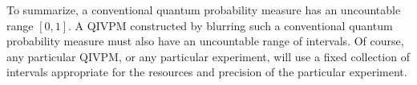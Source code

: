 \documentclass[english,reprint, aps, prl,superscriptaddress, showpacs,
showkeys, longbibliography, amsmath, amssymb, floatfix]{revtex4-1}
\theoremstyle{plain}
\theoremstyle{definition}
\newcommand{\imposs}{{\text{\wesa{impossible}}}}
\newcommand{\necess}{{\text{\wesa{certain}}}}
\newcommand{\proj}[1]{\op{#1}{#1}}
\newcommand{\ultramodular}{\mathcal{M}}
\newcommand{\muB}{\ensuremath{\mu^{B}}}
\newcommand{\gerardo}[1]{\fbox{\begin{minipage}{0.9\linewidth}\color{OliveGreen}{Gerardo says: #1}\end{minipage}}}
\begin{document}
To summarize, a conventional quantum probability measure has an
uncountable range $[0,1]$. A QIVPM constructed by blurring such a
conventional quantum probability measure must also have an uncountable
range of intervals. Of course, any particular QIVPM, or any particular
experiment, will use a fixed collection of intervals appropriate for
the resources and precision of the particular experiment. 
\gerardo{We need to explain physically what it means?}
\end{document}
